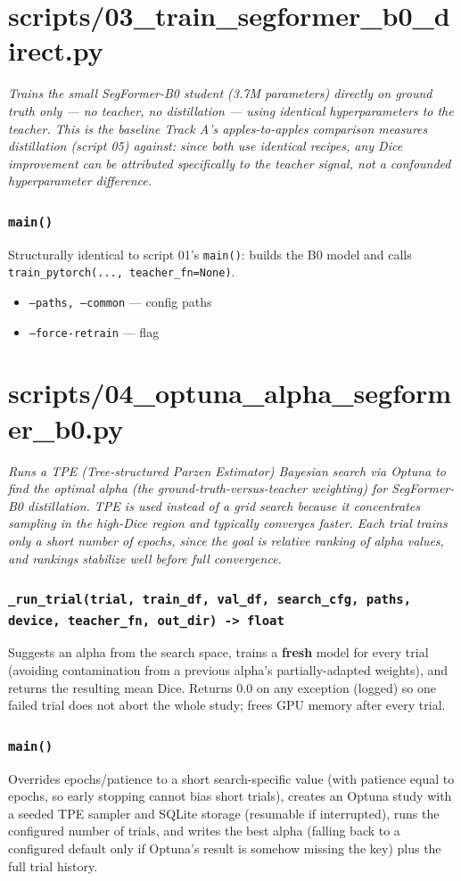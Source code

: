 \documentclass[11pt]{article}
\newcommand{\role}[1]{\par\noindent\textit{#1}\par\vspace{0.5em}}
\newcommand{\func}[1]{\subsubsection*{\texttt{#1}}}
\newcommand{\cliarg}[2]{\item \texttt{#1} --- #2}
\begin{document}
\section{scripts/03\_train\_segformer\_b0\_direct.py}
\role{Trains the small SegFormer-B0 student (3.7M parameters) directly on
ground truth only --- no teacher, no distillation --- using identical
hyperparameters to the teacher. This is the baseline Track A's apples-to-apples
comparison measures distillation (script 05) against: since both use identical
recipes, any Dice improvement can be attributed specifically to the teacher
signal, not a confounded hyperparameter difference.}

\func{main()}
Structurally identical to script 01's \texttt{main()}: builds the B0 model and
calls \texttt{train\_pytorch(..., teacher\_fn=None)}.

\begin{itemize}[nosep]
\cliarg{--paths, --common}{config paths}
\cliarg{--force-retrain}{flag}
\end{itemize}

\section{scripts/04\_optuna\_alpha\_segformer\_b0.py}
\role{Runs a TPE (Tree-structured Parzen Estimator) Bayesian search via Optuna
to find the optimal alpha (the ground-truth-versus-teacher weighting) for
SegFormer-B0 distillation. TPE is used instead of a grid search because it
concentrates sampling in the high-Dice region and typically converges faster.
Each trial trains only a short number of epochs, since the goal is
\emph{relative ranking} of alpha values, and rankings stabilize well before full
convergence.}

\func{\_run\_trial(trial, train\_df, val\_df, search\_cfg, paths, device, teacher\_fn, out\_dir) -> float}
Suggests an alpha from the search space, trains a \textbf{fresh} model for every
trial (avoiding contamination from a previous alpha's partially-adapted
weights), and returns the resulting mean Dice. Returns $0.0$ on any exception
(logged) so one failed trial does not abort the whole study; frees GPU memory
after every trial.

\func{main()}
Overrides epochs/patience to a short search-specific value (with patience equal
to epochs, so early stopping cannot bias short trials), creates an Optuna study
with a seeded TPE sampler and SQLite storage (resumable if interrupted), runs
the configured number of trials, and writes the best alpha (falling back to a
configured default only if Optuna's result is somehow missing the key) plus the
full trial history.
\end{document}
